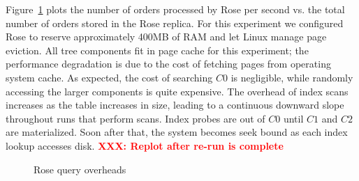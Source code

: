 \documentclass{vldb}
\newcommand{\rows}{Rose\xspace}
\newcommand{\rowss}{Rose's\xspace}
\newcommand{\xxx}[1]{\textcolor{red}{\bf XXX: #1}}
\begin{document}
Figure~\ref{fig:tpch} plots the number of orders processed by \rows
per second vs. the total number of orders stored in the \rows replica.
For this experiment we configured \rows to reserve approximately
400MB of RAM and let Linux manage page eviction.  All tree components
fit in page cache for this experiment; the performance degradation is
due to the cost of fetching pages from operating system cache.
As expected, the cost of searching $C0$ is negligible, while randomly
accessing the larger components is quite expensive.  The overhead of
index scans increases as the table increases in size, leading to a
continuous downward slope throughout runs that perform scans.  Index
probes are out of $C0$ until $C1$ and $C2$ are materialized.  Soon
after that, the system becomes seek bound as each index lookup
accesses disk.  \xxx{Replot after re-run is complete}

\begin{figure}
\centering {}
\caption{\rows query overheads}
\label{fig:tpch}
\end{figure}



\end{document}
